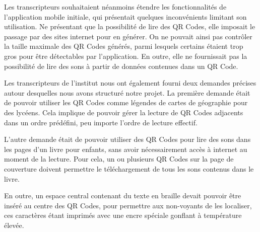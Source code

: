 \par
Les transcripteurs souhaitaient néanmoins étendre les fonctionnalités de l'application mobile initiale, qui présentait quelques inconvénients limitant son utilisation. Ne présentant que la possibilité de lire des QR Codes, elle imposait le passage par des sites internet pour en générer. On ne pouvait ainsi pas contrôler la taille maximale des QR Codes générés, parmi lesquels certains étaient trop gros pour être détectables par l'application. En outre, elle ne fournissait pas la possibilité de lire des sons à partir de données contenues dans un QR Code.\\

\par
Les transcripteurs de l'institut nous ont également fourni deux demandes précises autour desquelles nous avons structuré notre projet. La première demande était de pouvoir utiliser les QR Codes comme légendes de cartes de géographie pour des lycéens. Cela implique de pouvoir gérer la lecture de QR Codes adjacents dans un ordre prédéfini, peu importe l'ordre de lecture effectif.
\par
L'autre demande était de pouvoir utiliser des QR Codes pour lire des sons dans les pages d'un livre pour enfants, sans avoir nécessairement accès à internet au moment de la lecture. Pour cela, un ou plusieurs QR Codes sur la page de couverture doivent permettre le téléchargement de tous les sons contenus dans le livre.
\par
En outre, un espace central contenant du texte en braille devait pouvoir être inséré au centre des QR Codes, pour permettre aux non-voyants de les localiser, ces caractères étant imprimés avec une encre spéciale gonflant à température élevée.